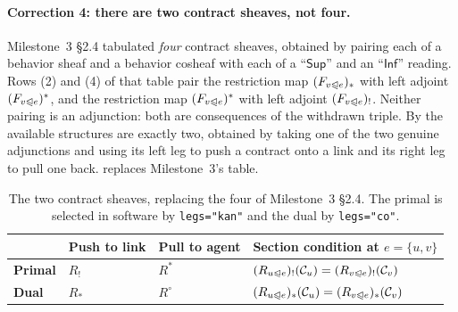 \documentclass[11pt]{article}
\newif\ifshowcomments
\newcommand{\cat}[1]{\mathsf{#1}}
\newcommand{\face}{\trianglelefteqslant}
\theoremstyle{definition}
\theoremstyle{remark}
\newcommand{\ai}[1]{%
    \ifshowcomments
        \noindent\textcolor{techred}{[AI Agent]: #1}%
    \fi
}
\begin{document}
\paragraph{Correction 4: there are two contract sheaves, not four.}
Milestone~3 \S2.4 tabulated \emph{four} contract sheaves, obtained by pairing each of a behavior
sheaf and a behavior cosheaf with each of a ``$\cat{Sup}$'' and an ``$\cat{Inf}$'' reading.
Rows (2) and (4) of that table pair the restriction map $(F_{v \face e})_*$ with left adjoint
$(F_{v \face e})^*$, and the restriction map $(F_{v \face e})^*$ with left adjoint
$(F_{v \face e})_!$.
Neither pairing is an adjunction: both are consequences of the withdrawn triple.
By  the available structures are exactly two, obtained by taking one
of the two genuine adjunctions and using its left leg to push a contract onto a link and its
right leg to pull one back.
 replaces Milestone~3's table.

\begin{table}[h]
\centering
\small
\begin{tabular}{@{}llll@{}}
\toprule
 & \textbf{Push to link} & \textbf{Pull to agent} & \textbf{Section condition at $e = \{u,v\}$} \\
\midrule
\textbf{Primal} & $R_!$      & $R^{*}$      & $ (R_{u \face e})_!(\mathcal{C}_u) = (R_{v \face e})_!(\mathcal{C}_v)$ \\
\textbf{Dual}   & $R_*$      & $R^{\circ}$  & $ (R_{u \face e})_*(\mathcal{C}_u) = (R_{v \face e})_*(\mathcal{C}_v)$ \\
\bottomrule
\end{tabular}
\caption{The two contract sheaves, replacing the four of Milestone~3 \S2.4. The primal is
selected in software by \texttt{legs="kan"} and the dual by \texttt{legs="co"}.}
\label{tab:two-sheaves}
\end{table}

\ai{\textbf{Correction 4.} The failure mode this rules out is specific and easy to commit:
pushing a contract onto a link with $R_*$ and pulling it back with $R^{*}$. Those are the two
maps Milestone~3's rows (2) and (4) pair, and they are exactly the pair for which no adjunction
exists. Every theorem in \S\ref{sec:laplacian} rests on the unit and counit of an adjunction, so
a mixed pairing silently invalidates all of them while still type-checking and still running.
The implementation forbids it structurally: \texttt{legs} selects a whole adjoint pair, and
there is no way to name one leg of each.}
\end{document}
